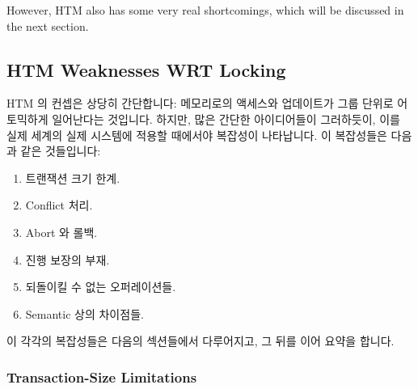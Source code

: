 However, HTM also has some very real shortcomings, which will be discussed
in the next section.
\fi

\subsection{HTM Weaknesses WRT Locking}
\label{sec:future:HTM Weaknesses WRT Locking}

HTM 의 컨셉은 상당히 간단합니다: 메모리로의 액세스와 업데이트가 그룹 단위로
어토믹하게 일어난다는 것입니다.
하지만, 많은 간단한 아이디어들이 그러하듯이, 이를 실제 세계의 실제 시스템에
적용할 때에서야 복잡성이 나타납니다.
이 복잡성들은 다음과 같은 것들입니다:
\iffalse

The concept of HTM is quite simple: A group of accesses and updates to
memory occurs atomically.
However, as is the case with many simple ideas, complications arise
when you apply it to real systems in the real world.
These complications are as follows:
\fi

\begin{enumerate}
\item	트랜잭션 크기 한계.
\item	Conflict 처리.
\item	Abort 와 롤백.
\item	진행 보장의 부재.
\item	되돌이킬 수 없는 오퍼레이션들.
\item	Semantic 상의 차이점들.
\iffalse

\item	Transaction-size limitations.
\item	Conflict handling.
\item	Aborts and rollbacks.
\item	Lack of forward-progress guarantees.
\item	Irrevocable operations.
\item	Semantic differences.
\fi
\end{enumerate}

이 각각의 복잡성들은 다음의 섹션들에서 다루어지고, 그 뒤를 이어 요약을 합니다.
\iffalse

Each of these complications is covered in the following sections,
followed by a summary.
\fi

\subsubsection{Transaction-Size Limitations}
\label{sec:future:Transaction-Size Limitations}

